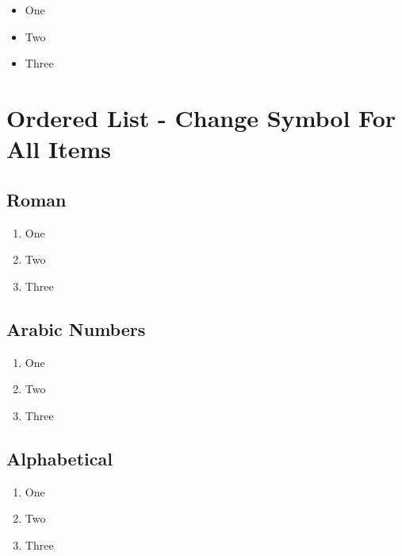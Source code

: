 \documentclass[]{article}
\begin{document}
\begin{itemize}[label=$\ast$]
	\item One
    \item Two
    \item Three
\end{itemize}

\section{Ordered List - Change Symbol For All Items}

\subsection{Roman}
\begin{enumerate}[label=(\roman*)]
	\item One
	\item Two
	\item Three
\end{enumerate}

\subsection{Arabic Numbers}
\begin{enumerate}[label=\arabic*)]
	\item One
	\item Two
	\item Three
\end{enumerate}

\subsection{Alphabetical}
\begin{enumerate}[label=\alph*)]
	\item One
	\item Two
	\item Three
\end{enumerate}
\end{document}
